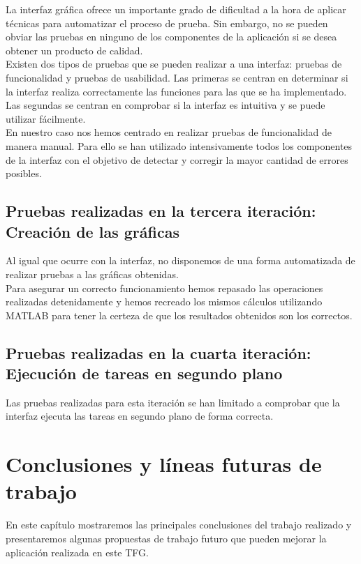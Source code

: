 \documentclass[12pt, a4paper]{book}
\begin{document}
La interfaz gráfica ofrece un importante grado de dificultad a la hora de aplicar técnicas para automatizar el proceso de prueba. Sin embargo, no se pueden obviar las pruebas en ninguno de los componentes de la aplicación si se desea obtener un producto de calidad.\\

Existen dos tipos de pruebas que se pueden realizar a una interfaz: pruebas de funcionalidad y pruebas de usabilidad. Las primeras se centran en determinar si la interfaz realiza correctamente las funciones para las que se ha implementado. Las segundas se centran en comprobar si la interfaz es intuitiva y se puede utilizar fácilmente.\\

En nuestro caso nos hemos centrado en realizar pruebas de funcionalidad de manera manual. Para ello se han utilizado intensivamente todos los componentes de la interfaz con el objetivo de detectar y corregir la mayor cantidad de errores posibles.

\section{Pruebas realizadas en la tercera iteración: Creación de las gráficas }

Al igual que ocurre con la interfaz, no disponemos de una forma automatizada de realizar pruebas a las gráficas obtenidas.\\

Para asegurar un correcto funcionamiento hemos repasado las operaciones realizadas detenidamente y hemos recreado los mismos cálculos utilizando MATLAB para tener la certeza de que los resultados obtenidos son los correctos.

\section{Pruebas realizadas en la cuarta iteración: Ejecución de tareas en segundo plano}

Las pruebas realizadas para esta iteración se han limitado a comprobar que la interfaz ejecuta las tareas en segundo plano de forma correcta.

\newpage

\chapter{Conclusiones y líneas futuras de trabajo}

En este capítulo mostraremos las principales conclusiones del trabajo realizado y presentaremos algunas
propuestas de trabajo futuro que pueden mejorar la aplicación realizada en este \gls{TFG}.
\end{document}
